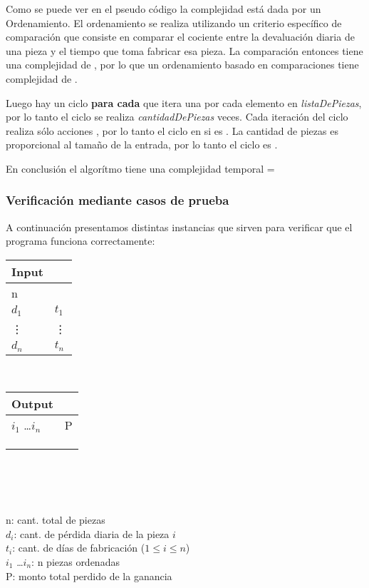 \documentclass[11pt, a4paper, twoside]{article}
\begin{document}
  Como se puede ver en el pseudo código la complejidad está dada por un Ordenamiento.
El ordenamiento se realiza utilizando un criterio específico de comparación que consiste
en comparar el cociente entre la devaluación diaria de una pieza y el tiempo que toma
fabricar esa pieza. La comparación entonces tiene una complejidad de , por lo que
un ordenamiento basado en comparaciones tiene complejidad de .

  Luego hay un ciclo \textbf{para cada} que itera una por cada elemento en \textit{listaDePiezas},
por lo tanto el ciclo se realiza \textit{cantidadDePiezas} veces. Cada iteración del ciclo realiza
sólo acciones , por lo tanto el ciclo en si es . La cantidad de piezas
es proporcional al tamaño de la entrada, por lo tanto el ciclo es .

  En conclusión el algorítmo tiene una complejidad temporal =

  




\subsubsection{Verificación mediante casos de prueba}

A continuación presentamos distintas instancias que sirven para verificar que el programa funciona correctamente: \\ 

\begin{minipage}{0.2\textwidth}
	\begin{tabular}{ll}
		Input  \\
		\hline
		n &  \\
		$d_1$ & $t_1$ \\
		\vdots & \vdots \\
		$d_n$ & $t_n$ 
	\end{tabular} \\ 
\end{minipage}
\begin{minipage}{0.2\textwidth}
	\begin{tabular}{ll}
		Output  \\
		\hline
		$i_1$ \dots $i_n$ & P \\
		 \\
		 \\
		 \\
	\end{tabular} \\ 
\end{minipage}  \\
\\
n: cant. total de piezas  \\
$d_i$: cant. de pérdida diaria de la pieza $i$ \\
$t_i$: cant. de días de fabricación ($1 \le i \le n$) \\
$i_1$ \dots $i_n$: n piezas ordenadas \\
P: monto total perdido de la ganancia \\
\end{document}
